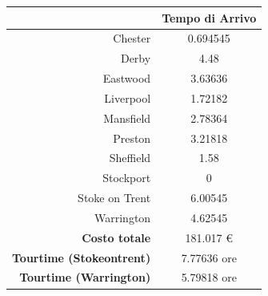 
		\begin{table}[H]
			\small
			\centering
			\label{table:instance_1_arrival}
			\begin{tabular}{rc}

				\toprule
				& Tempo di Arrivo \\

				\midrule
				Chester & 0.694545 \\
				Derby & 4.48 \\
				Eastwood & 3.63636 \\
				Liverpool & 1.72182 \\
				Mansfield & 2.78364 \\
				Preston & 3.21818 \\
				Sheffield & 1.58 \\
				Stockport & 0 \\
				Stoke on Trent & 6.00545 \\
				Warrington & 4.62545 \\
				\midrule
				\textbf{Costo totale} & 181.017 € \\
				\textbf{Tourtime (Stokeontrent)} & 7.77636 ore \\
				\textbf{Tourtime (Warrington)} & 5.79818 ore \\
				\bottomrule
			\end{tabular}
		\end{table}



